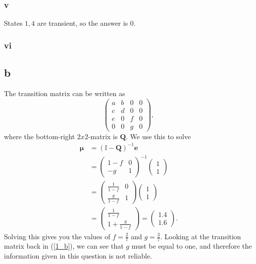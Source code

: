 \documentclass{article}
\begin{document}
\subsubsection{v}
States $1,4$ are transient, so the answer is $0$.

\subsubsection{vi}


\subsection{b}
The transition matrix can be written as
\begin{equation}
    \begin{pmatrix}
        a & b & 0 & 0 \\
        c & d & 0 & 0 \\
        e & 0 & f & 0 \\
        0 & 0 & g & 0 
    \end{pmatrix},\label{1_b}
\end{equation}
where the bottom-right $2x2$-matrix is $\mathbf{Q}$. We use this to solve 
\begin{align}
    \mathbf{\mu} &= (\mathbb{I} - \mathbf{Q})^{-1}\mathbf{e} \\
     &= \begin{pmatrix}
         1-f & 0 \\
         -g & 1
     \end{pmatrix}^{-1}\begin{pmatrix}
         1 \\ 1
     \end{pmatrix}\\
    &= \begin{pmatrix}
        \frac{1}{1-f} & 0 \\
        \frac{g}{1-f} & 1
    \end{pmatrix}\begin{pmatrix}
        1 \\ 1
    \end{pmatrix} \\
    &= \begin{pmatrix}
        \frac{1}{1-f} \\ 1+\frac{g}{1-f}     
    \end{pmatrix}= \begin{pmatrix}
        1.4 \\ 1.6
    \end{pmatrix}.
\end{align}
Solving this gives you the values of $f=\frac{2}{7}$ and $g=\frac{3}{7}$. Looking at the transition matrix back in (\ref{1_b}), we can see that $g$ must be equal to one, and therefore the information given in this question is not reliable.
\end{document}
